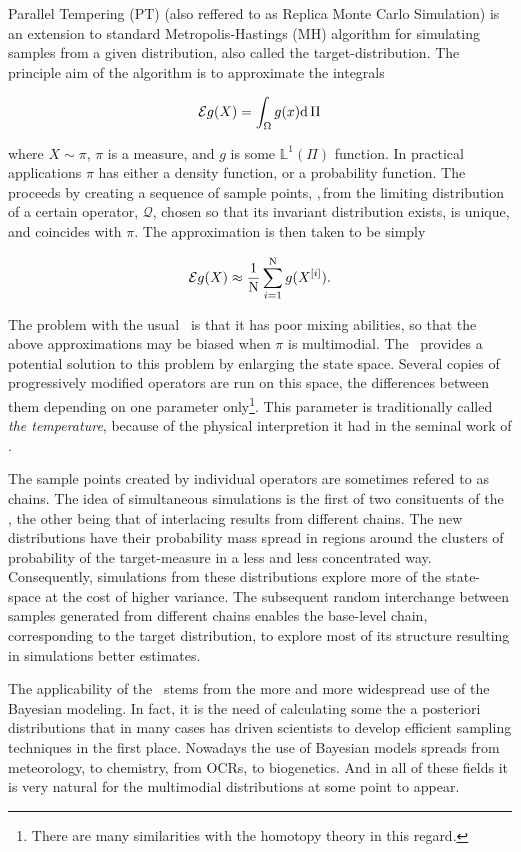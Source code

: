 
Parallel Tempering (PT) (also reffered to as Replica Monte Carlo Simulation) is an extension to standard Metropolis-Hastings (MH) algorithm for simulating samples from a given distribution, also called the target-distribution. The principle aim of the algorithm is to approximate the integrals 

\begin{equation}\label{mainGoal}
	\mathcal{E} g(X) = \int_\Omega g(x) \mathrm{d }\,\Pi
\end{equation}

where $X\sim \pi$, $\pi$ is a measure, and $g$ is some $\mathbb{L}^1(\Pi)$ function. In practical applications $\pi$ has either a density function, or a probability function. The \MH\, proceeds by creating a sequence of sample points, \sample,\,from the limiting distribution of a certain operator, $\mathcal{Q}$, chosen so that its invariant distribution exists, is unique, and coincides with $\pi$. The approximation is then taken to be simply

\begin{equation*}
	\mathcal{E} g(X) \approx \frac{1}{\mathrm{N}}\sum_{i = 1}^{\mathrm{N}} g(X^{[i]}).
\end{equation*}

The problem with the usual \MH\, is that it has poor mixing abilities, so that the above approximations may be biased when $\pi$ is multimodial. The \PT\, provides a potential solution to this problem by enlarging the state space. Several copies of progressively modified operators are run on this space, the differences between them depending on one parameter only\footnote{There are many similarities with the homotopy theory in this regard.}. This parameter is traditionally called {\it the temperature}, because of the physical interpretion it had in the seminal work of \cite{RobertSwendsen}. 

The sample points created by individual operators are sometimes refered to as chains. The idea of simultaneous simulations is the first of two consituents of the \PT, the other being that of interlacing results from different chains. The new distributions have their probability mass spread in regions around the clusters of probability of the target-measure in a less and less concentrated way. Consequently, simulations from these distributions explore more of the state-space at the cost of higher variance. The subsequent random interchange between samples generated from different chains enables the base-level chain, corresponding to the target distribution, to explore most of its structure resulting in simulations better estimates.

The applicability of the \PT\, stems from the more and more widespread use of the Bayesian modeling. In fact, it is the need of calculating some the a posteriori distributions that in many cases has driven scientists to develop efficient sampling techniques in the first place. Nowadays the use of Bayesian models spreads from meteorology, to chemistry, from OCRs, to biogenetics. And in all of these fields it is very natural for the multimodial distributions at some point to appear.